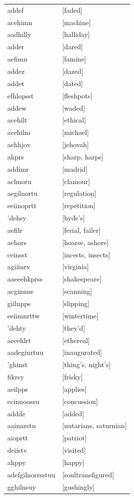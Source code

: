 \documentclass{article}
\begin{document}
\begin{tabular}{ll}
addef & [faded] \\
acehimn & [machine] \\
aadhilly & [halliday] \\
adder & [dared] \\
aefimn & [famine] \\
addez & [dazed] \\
addet & [dated] \\
efhlopsst & [fleshpots] \\
addew & [waded] \\
acehilt & [ethical] \\
acehilm & [michael] \\
aehhjov & [jehovah] \\
ahprs & [sharp, harps] \\
addimr & [madrid] \\
aclmoru & [clamour] \\
aegilnortu & [regulation] \\
eeiinoprtt & [repetition] \\
'dehsy & [hyde's] \\
aefilr & [ferial, failer] \\
aehors & [hoarse, ashore] \\
ceinsst & [incests, insects] \\
agiiinrv & [virginia] \\
aaeeehkprss & [shakespeare] \\
acginnns & [scanning] \\
giilnpps & [slipping] \\
eeiimnrttw & [wintertime] \\
'dehty & [they'd] \\
aeeehlrt & [ethereal] \\
aadeginrtuu & [inaugurated] \\
'ghinst & [thing's, night's] \\
fikrsy & [frisky] \\
aeilpps & [applies] \\
ccinnoossu & [concussion] \\
addde & [added] \\
aainnrstu & [nutarians, saturnian] \\
aioprtt & [patriot] \\
deiistv & [visited] \\
ahppy & [happy] \\
adefgilnorrsstuu & [soultransfigured] \\
gghilnsuy & [gushingly] \\

\end{tabular}
\end{document}
